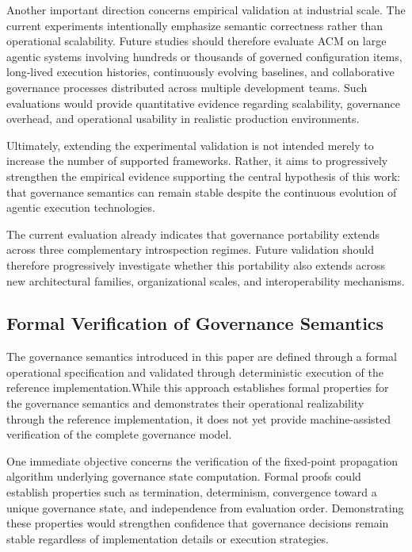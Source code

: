 \documentclass[10pt]{article}
\begin{document}
Another important direction concerns empirical validation at industrial scale. The current experiments intentionally emphasize semantic correctness rather than operational scalability. Future studies should therefore evaluate ACM on large agentic systems involving hundreds or thousands of governed configuration items, long-lived execution histories, continuously evolving baselines, and collaborative governance processes distributed across multiple development teams. Such evaluations would provide quantitative evidence regarding scalability, governance overhead, and operational usability in realistic production environments.

Ultimately, extending the experimental validation is not intended merely to increase the number of supported frameworks. Rather, it aims to progressively strengthen the empirical evidence supporting the central hypothesis of this work: that governance semantics can remain stable despite the continuous evolution of agentic execution technologies.

The current evaluation already indicates that governance portability extends across three complementary introspection regimes. Future validation should therefore progressively investigate whether this portability also extends across new architectural families, organizational scales, and interoperability mechanisms.

\subsection{Formal Verification of Governance Semantics}
\label{sec:future_formal_verification}

The governance semantics introduced in this paper are defined through a formal operational specification and validated through deterministic execution of the reference implementation.While this approach establishes formal properties for the governance semantics and demonstrates their operational realizability through the reference implementation, it does not yet provide machine-assisted verification of the complete governance model.

One immediate objective concerns the verification of the fixed-point propagation algorithm underlying governance state computation. Formal proofs could establish properties such as termination, determinism, convergence toward a unique governance state, and independence from evaluation order. Demonstrating these properties would strengthen confidence that governance decisions remain stable regardless of implementation details or execution strategies.
\end{document}
